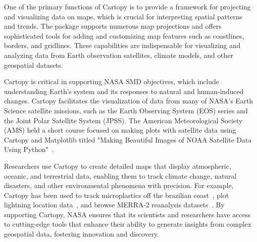 \documentclass[12pt]{article}
\numberwithin{page}{section}
\begin{document}
One of the primary functions of Cartopy is to provide a framework for projecting and visualizing data on maps,
which is crucial for interpreting spatial patterns and trends.
The package supports numerous map projections and offers sophisticated tools for
adding and customizing map features such as coastlines, borders, and gridlines.
These capabilities are indispensable for visualizing and analyzing data from
Earth observation satellites, climate models, and other geospatial datasets.

Cartopy is critical in supporting NASA SMD objectives,
which include understanding Earth's system and its responses to natural and human-induced changes.
Cartopy facilitates the visualization of data from many of NASA's Earth Science satellite missions,
such as the Earth Observing System (EOS) series and the Joint Polar Satellite System (JPSS).
The American Meteorological Society (AMS) held a short course focused on making
plots with satellite data using Cartopy and Matplotlib titled
"Making Beautiful Images of NOAA Satellite Data Using Python"~\cite{noaa_short_course}.

Researchers use Cartopy to create detailed maps that display atmospheric, oceanic,
and terrestrial data, enabling them to track climate change, natural disasters,
and other environmental phenomena with precision. For example, Cartopy
has been used to track microplastics off the brazilian coast~\cite{tracking_microplastics},
plot lightning location data~\cite{lightning_location}, and browse MERRA-2
reanalysis datasets~\cite{merra2_plotting}.
By supporting Cartopy, NASA ensures that its scientists and researchers
have access to cutting-edge tools that enhance their ability to generate
insights from complex geospatial data, fostering innovation and discovery.


\end{document}
